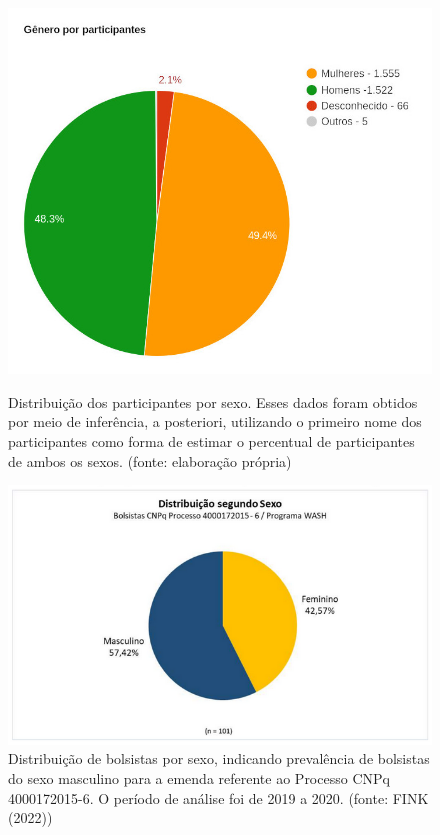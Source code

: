 \captionsetup{format=plain}
\begin{figure}[htb]

\centering


\begin{minipage}[b]{0.4\linewidth}
        \centering
                \includegraphics[width=1.0\linewidth]{../../../imagens/genero-todos-crop.jpeg}
                \caption{Distribuição dos participantes por sexo. Esses dados foram obtidos por meio de inferência, a posteriori, utilizando o primeiro nome dos participantes como forma de estimar o percentual de participantes de ambos os sexos. (fonte: elaboração própria)}
                \label{ef11d820efb73d78fb64eb6bdd03853471a8e89f}
\end{minipage}%
\hspace{0.5cm}
\begin{minipage}[b]{0.4\linewidth}
        \centering
                \includegraphics[width=1.0\linewidth]{../../../imagens/distribuicao-sexo-bolsistas.png}
                \caption{Distribuição de bolsistas por sexo, indicando prevalência de bolsistas do sexo masculino para a emenda referente ao Processo CNPq 4000172015-6. O período de análise foi de 2019 a 2020. (fonte: FINK (2022))}
                \label{1164a3115bd14e3f25b6b141840652ffbd0d2374}
\end{minipage}
\hspace{0.5cm}
\end{figure}



